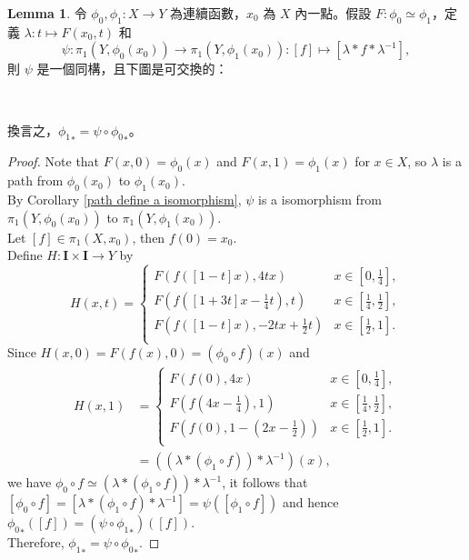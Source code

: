 \documentclass[12pt]{article}
\theoremstyle{definition}
\newtheorem{lemma}[definition]{Lemma}
\newcommand\<{\langle}
\renewcommand\>{\rangle}
\begin{document}
\begin{CJK}{UTF8}{bsmi}
\begin{lemma}
\label{homotopy up to pi1 is commutative}
    令 $\phi_0, \phi_1:X\to Y$ 為連續函數，$x_0$ 為 $X$ 內一點。假設 $F:\phi_0\simeq\phi_1$，定義 $\lambda:t\mapsto F(x_0, t)$ 和
    \[
        \psi:\pi_1(Y, \phi_0(x_0))\to\pi_1(Y, \phi_1(x_0)):[f]\mapsto[\lambda*f*\lambda^{-1}],
    \]
    則 $\psi$ 是一個同構，且下圖是可交換的：
    \begin{center}
     \\
    \end{center}
    換言之，${\phi_1}_*=\psi\circ{\phi_0}_*$。
\end{lemma}
\begin{proof}
    Note that $F(x, 0)=\phi_0(x)$ and $F(x, 1)=\phi_1(x)$ for $x\in X$, so $\lambda$ is a path from $\phi_0(x_0)$ to $\phi_1(x_0)$. \\ 
    By Corollary \ref{path define a isomorphism}, $\psi$ is a isomorphism from $\pi_1(Y, \phi_0(x_0))$ to $\pi_1(Y, \phi_1(x_0))$. \\
    Let $[f]\in\pi_1(X, x_0)$, then $f(0)=x_0$. \\
    Define $H:\textbf{I}\times\textbf{I}\to Y$ by
    \[
        H(x, t) = \begin{cases}
            F(f([1-t]x), 4tx) & x\in[0, \frac{1}{4}], \\
            F(f([1+3t]x-\frac{1}{4}t), t) & x\in[\frac{1}{4}, \frac{1}{2}], \\
            F(f([1-t]x), -2tx+\frac{1}{2}t) & x\in[\frac{1}{2}, 1]. \\
        \end{cases}
    \]
    Since $H(x, 0)=F(f(x), 0)=(\phi_0\circ f)(x)$ and 
    \begin{align*}
        H(x, 1) 
        & = \begin{cases}
            F(f(0), 4x) & x\in[0, \frac{1}{4}], \\
            F(f(4x-\frac{1}{4}), 1) & x\in[\frac{1}{4}, \frac{1}{2}], \\
            F(f(0), 1-(2x-\frac{1}{2})) & x\in[\frac{1}{2}, 1]. \\
        \end{cases} \\
        & = ((\lambda * (\phi_1\circ f)) * \lambda^{-1})(x),
    \end{align*}
    we have $\phi_0\circ f\simeq(\lambda * (\phi_1\circ f)) * \lambda^{-1}$, it follows that $[\phi_0\circ f]=[\lambda * (\phi_1\circ f) * \lambda^{-1}]=\psi([\phi_1\circ f])$ and hence ${\phi_0}_*([f])=(\psi\circ{\phi_1}_*)([f])$. \\
    Therefore, ${\phi_1}_*=\psi\circ{\phi_0}_*$.
\end{proof}


\end{CJK}
\end{document}
